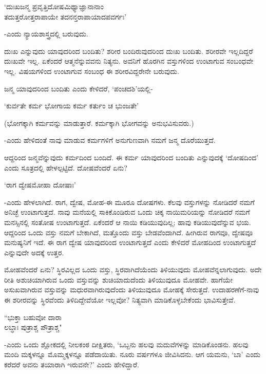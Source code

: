 \begin{shloka}
`ದುಃಖಜನ್ಮ ಪ್ರವೃತ್ತಿದೋಷಮಿಥ್ಯಾಜ್ಞಾನಾನಾಂ\\
ತದುತ್ತರೋತ್ತರಾಪಾಯೇ ತದನನ್ತರಾಪಾಯಾದಪವರ್ಗಃ'
\end{shloka}

-ಎಂದು ನ್ಯಾಯಶಾಸ್ತ್ರದಲ್ಲಿ ಬರುವುದು.

ದುಃಖ ಎನ್ನುವುದು ಯಾವುದರಿಂದ ಬಂದಿತು? ಶರೀರ ಬಂದಿರುವುದರಿಂದ ದುಃಖ ಬಂದಿತು. ಶರೀರವೇ ಇಲ್ಲದಿದ್ದರೆ ದುಃಖವೇ ಇಲ್ಲ. ಏಕೆಂದರೆ ಆತ್ಮನೆನ್ನುವವನು ನಿತ್ಯನು. ಅವನಿಗೆ ಹೊರಗಿನ ವಸ್ತುಗಳಿಂದ ಉಂಟಾಗುವ ಸಂಬಂಧವೇ ಇಲ್ಲ. ವಿಷಯಗಳಿಂದ ಉಂಟಾಗುವ ಸಂಬಂಧ ಈ ಶರೀರವಿದ್ದರೇನೇ ಬರುವುದು.

ಜನ್ಮ ಯಾವುದರಿಂದ ಬಂದಿತು ಎಂದು ಕೇಳಿದರೆ, `ಪಂಚದಶಿ'ಯಲ್ಲಿ-

\begin{shloka}
`ಕುರ್ವತೇ ಕರ್ಮ ಭೋಗಾಯ ಕರ್ಮ ಕರ್ತುಂ ಚ ಭುಂಜತೇ'
\end{shloka}

(ಭೋಗಕ್ಕಾಗಿ ಕರ್ಮವನ್ನು ಮಾಡುತ್ತಾರೆ. ಕರ್ಮಕ್ಕಾಗಿ ಭೋಗವನ್ನು ಅನುಭವಿಸುವರು.)

-ಎಂದು ಹೇಳಿದಂತೆ ನಾವು ಮಾಡುವ ಕರ್ಮಗಳಿಗೆ ಅನುಗುಣವಾಗಿ ನಮಗೆ ಜನ್ಮ ದೊರೆಯುತ್ತದೆ.

ಆದ್ದರಿಂದ ಜನ್ಮವೆನ್ನುವುದು ಕರ್ಮದಿಂದ ಬಂದಿದೆ. ಈ ಕರ್ಮ ಯಾವುದರಿಂದ ಬಂದಿತು ಎನ್ನುವುದಕ್ಕೆ `ದೋಷದಿಂದ' ಎಂದು ಸೂತ್ರದಲ್ಲಿ ಹೇಳಲ್ಪಟ್ಟಿದೆ. ದೋಷವೆಂದರೆ ಏನು?

\begin{shloka}
`ರಾಗ ದ್ವೇಷಮೋಹಾ ದೋಷಾಃ'
\end{shloka}

-ಎಂದು ಹೇಳಲಾಗಿದೆ. ರಾಗ, ದ್ವೇಷ, ಮೋಹ-ಈ ಮೂರೂ ದೋಷಗಳು. ಕೆಲವು ವಸ್ತುಗಳನ್ನು ನೋಡಿದರೆ ನಮಗೆ ಅನಿಚ್ಛೆ ಉಂಟಾಗುತ್ತದೆ. ನಾವು ಮನೆಯಲ್ಲಿ ಸಾಕಿಕೊಂಡಿರುವ ಒಂದು ಚಿಕ್ಕ ನಾಯಿಮರಿಯನ್ನು ನೋಡಿದರೆ ನಮಗೆ ಮನಸ್ಸಿನಲ್ಲಿ ಸಂತೋಷ ಉಂಟಾಗುತ್ತದೆ. ಏಕೆಂದರೆ ಆ ನಾಯಿ ಕಡಿಯುವುದಿಲ್ಲ; ಹಾವು ಕಡಿಯುವುದೆನ್ನುವ ಭಯ. ಆದ್ದರಿಂದ ಒಂದು ವಸ್ತು ನಮಗೆ ಬೇಕಾಗಿದೆ, ಮತ್ತೊಂದು ವಸ್ತು ಬೇಡವೆಂದಾಗಿದೆ. ಹೀಗಿರುವ ರಾಗವೂ, ದ್ವೇಷವೂ ಮನುಷ್ಯನಿಗೆ ಇದೆ. ಈ ರಾಗ ದ್ವೇಷ ಯಾವುದರಿಂದ ಉಂಟಾಗುತ್ತದೆ ಎಂದು ಕೇಳಿದರೆ ಮೋಹದಿಂದ ಉಂಟಾಗುತ್ತದೆ ಎನ್ನುವುದೇ ಅದಕ್ಕೆ ಉತ್ತರ.

ಮೋಹವೆಂದರೆ ಏನು? ಸ್ಥಿರವಿಲ್ಲದ ಒಂದು ವಸ್ತು, ಸ್ಥಿರವಾಗಿದೆಯೆಂದು ತಿಳಿಯುವುದು ಮೋಹವೆನ್ನಲಾಗುವುದು. ಅದೇ ರೀತಿ ಅಶುಚಿಯಾಗಿರುವ ಒಂದು ವಸ್ತುವನ್ನು ಶುಚಿಯಾದುದೆಂದು ತಿಳಿಯುವುದೂ ಮೋಹವೇ. ಹಾಗೆಯೇ ಅಸುಖವಾಗಿರುವ ವಸ್ತುವನ್ನು ಮಧುರವಾಗಿರುವುದೆಂದು ತಿಳಿಯುವುದೂ ಮೋಹಕ್ಕೆ ಸೇರುತ್ತದೆ. ಉದಾಹರಣೆಗೆ-ನಾವು ಈ ಶರೀರವನ್ನು ಸ್ಥಿರವೆಂದು ತಿಳಿದಿದ್ದೇವೆಯೋ ಇಲ್ಲವೋ? ನಿತ್ಯವಾಗಿ ಮಾಡಿಕೊಳ್ಳಬೇಕೆಂದು ಭಾವಿಸುತ್ತೇವೆ.

\begin{shloka}
``ಭುಕ್ತಾ ಬಹುವೋ ದಾರಾ\\
ಲಬ್ಧಾಃ ಪುತ್ರಾಶ್ಚ ಪೌತ್ರಾಶ್ಚ"
\end{shloka}

-ಎಂದು ಒಂದು ಶ್ಲೋಕದಲ್ಲಿ ನೀಲಕಂಠ ದೀಕ್ಷಿತರು, `ಒಬ್ಬನು ಹಲವು ಮದುವೆಗಳನ್ನು ಮಾಡಿಕೊಂಡನು. ಹಲವು ಮಂದಿ ಮಕ್ಕಳನ್ನೂ ಮೊಮ್ಮಕ್ಕಳನ್ನೂ ಪಡೆದಾಯಿತು. ನೂರು ವರ್ಷಗಳೂ ಜೀವಿಸಿದನು. ಆಗ ಯಮನು, `ಬಾ' ಎಂದು ಕರೆದರೆ ಅವನು ತಯಾರಾಗಿ ಇರುವನೇ?' ಎಂದು ಹೇಳಿದ್ದಾರೆ.

